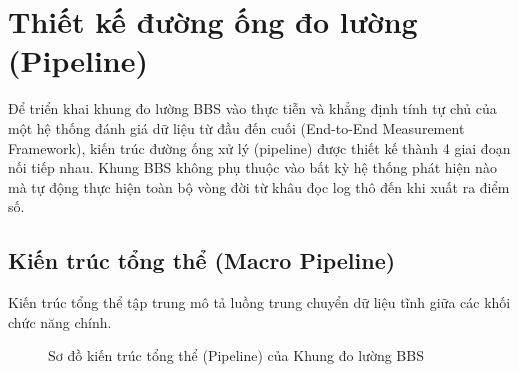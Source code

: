 \documentclass[../main.tex]{subfiles}
\begin{document}
\section{Thiết kế đường ống đo lường (Pipeline)}
\label{section:2.3}

Để triển khai khung đo lường BBS vào thực tiễn và khẳng định tính tự chủ của một hệ thống đánh giá dữ liệu từ đầu đến cuối (End-to-End Measurement Framework), kiến trúc đường ống xử lý (pipeline) được thiết kế thành 4 giai đoạn nối tiếp nhau. Khung BBS không phụ thuộc vào bất kỳ hệ thống phát hiện nào mà tự động thực hiện toàn bộ vòng đời từ khâu đọc log thô đến khi xuất ra điểm số.

\subsection{Kiến trúc tổng thể (Macro Pipeline)}
Kiến trúc tổng thể tập trung mô tả luồng trung chuyển dữ liệu tĩnh giữa các khối chức năng chính.

\begin{figure}[H]
\centering
{}
\caption{Sơ đồ kiến trúc tổng thể (Pipeline) của Khung đo lường BBS}
\label{fig:bbs_pipeline}
\end{figure}
\end{document}
